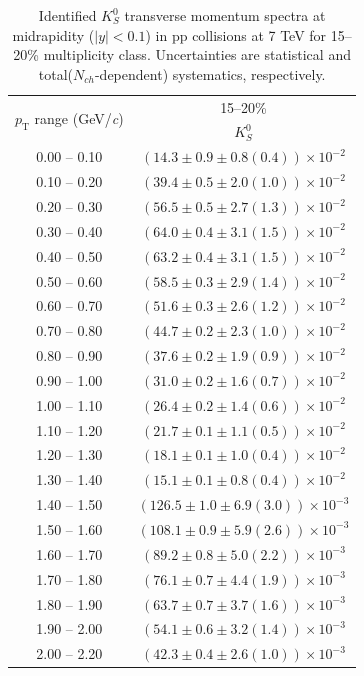 \begin{table}
\caption{Identified $K^{0}_{S}$ transverse momentum spectra at midrapidity ($|y|<0.1$) in pp collisions at 7 TeV for 15--20\% multiplicity class. Uncertainties are statistical and total($N_{ch}$-dependent) systematics, respectively.}
\label{tab:K0Short_15to20}
\begin{center}
\begin{tabular}{ c | c }
\hline
\multirow{2}{*}{$p_{\mathrm{T}}$ range (GeV/\textit{c})} & \multicolumn{1}{c}{15--20\%} \\ & $K^{0}_{S}$\\ 
\hline
0.00 -- 0.10 & $(14.3\pm0.9\pm0.8(0.4))\times10^{-2}$ \\ 
0.10 -- 0.20 & $(39.4\pm0.5\pm2.0(1.0))\times10^{-2}$ \\ 
0.20 -- 0.30 & $(56.5\pm0.5\pm2.7(1.3))\times10^{-2}$ \\ 
0.30 -- 0.40 & $(64.0\pm0.4\pm3.1(1.5))\times10^{-2}$ \\ 
0.40 -- 0.50 & $(63.2\pm0.4\pm3.1(1.5))\times10^{-2}$ \\ 
0.50 -- 0.60 & $(58.5\pm0.3\pm2.9(1.4))\times10^{-2}$ \\ 
0.60 -- 0.70 & $(51.6\pm0.3\pm2.6(1.2))\times10^{-2}$ \\ 
0.70 -- 0.80 & $(44.7\pm0.2\pm2.3(1.0))\times10^{-2}$ \\ 
0.80 -- 0.90 & $(37.6\pm0.2\pm1.9(0.9))\times10^{-2}$ \\ 
0.90 -- 1.00 & $(31.0\pm0.2\pm1.6(0.7))\times10^{-2}$ \\ 
1.00 -- 1.10 & $(26.4\pm0.2\pm1.4(0.6))\times10^{-2}$ \\ 
1.10 -- 1.20 & $(21.7\pm0.1\pm1.1(0.5))\times10^{-2}$ \\ 
1.20 -- 1.30 & $(18.1\pm0.1\pm1.0(0.4))\times10^{-2}$ \\ 
1.30 -- 1.40 & $(15.1\pm0.1\pm0.8(0.4))\times10^{-2}$ \\ 
1.40 -- 1.50 & $(126.5\pm1.0\pm6.9(3.0))\times10^{-3}$ \\ 
1.50 -- 1.60 & $(108.1\pm0.9\pm5.9(2.6))\times10^{-3}$ \\ 
1.60 -- 1.70 & $(89.2\pm0.8\pm5.0(2.2))\times10^{-3}$ \\ 
1.70 -- 1.80 & $(76.1\pm0.7\pm4.4(1.9))\times10^{-3}$ \\ 
1.80 -- 1.90 & $(63.7\pm0.7\pm3.7(1.6))\times10^{-3}$ \\ 
1.90 -- 2.00 & $(54.1\pm0.6\pm3.2(1.4))\times10^{-3}$ \\ 
2.00 -- 2.20 & $(42.3\pm0.4\pm2.6(1.0))\times10^{-3}$ \\ 

\end{tabular}
\end{center}
\end{table}

